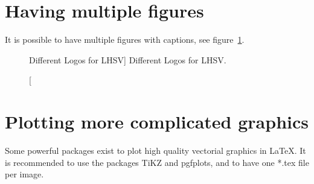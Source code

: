 \section{Having multiple figures}

It is possible to have multiple figures with captions, see figure~\ref{fig:ExampleMultipleImages}.

\begin{figure}[H]%
\begin{center}
%
\hfil
%
%
\hfil
%
%
\hfil
\mbox{}
\end{center}
\caption
[Different Logos for LHSV]
{Different Logos for LHSV.}
\label{fig:ExampleMultipleImages}
\end{figure}

\section{Plotting more complicated graphics}

Some powerful packages exist to plot high quality vectorial graphics in LaTeX. It is recommended to use the packages TiKZ and pgfplots, and to have
one *.tex file per image.
